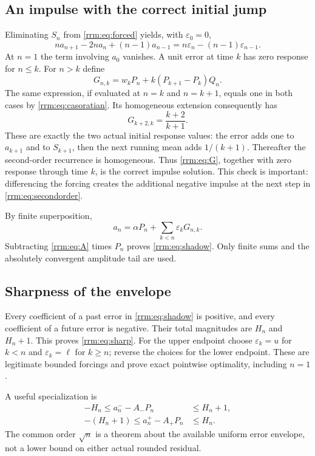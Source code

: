 \documentclass[11pt]{article}
\theoremstyle{remark}\newtheorem{remark}[theorem]{Remark}
\newcommand{\eps}{\varepsilon}
\begin{document}
\subsection{An impulse with the correct initial jump}
Eliminating $S_n$ from \eqref{rrm:eq:forced} yields, with $\eps_0=0$,
\begin{equation}\label{rrm:eq:secondorder}
 na_{n+1}-2na_n+(n-1)a_{n-1}
 =n\eps_n-(n-1)\eps_{n-1}.
\end{equation}
At $n=1$ the term involving $a_0$ vanishes. A unit error at time $k$ has zero response for $n\le k$. For $n>k$ define
\begin{equation}\label{rrm:eq:G}
 G_{n,k}=w_kP_n+k(P_{k+1}-P_k)Q_n.
\end{equation}
The same expression, if evaluated at $n=k$ and $n=k+1$, equals one in both cases by \eqref{rrm:eq:casoratian}. Its homogeneous extension consequently has
\[
 G_{k+2,k}=\frac{k+2}{k+1}.
\]
These are exactly the two actual initial response values: the error adds one to $a_{k+1}$ and to $S_{k+1}$, then the next running mean adds $1/(k+1)$. Thereafter the second-order recurrence is homogeneous. Thus \eqref{rrm:eq:G}, together with zero response through time $k$, is the correct impulse solution. This check is important: differencing the forcing creates the additional negative impulse at the next step in \eqref{rrm:eq:secondorder}.

By finite superposition,
\begin{equation}\label{rrm:eq:variation}
 a_n=\alpha P_n+\sum_{k<n}\eps_kG_{n,k}.
\end{equation}
Subtracting \eqref{rrm:eq:A} times $P_n$ proves \eqref{rrm:eq:shadow}. Only finite sums and the absolutely convergent amplitude tail are used.

\subsection{Sharpness of the envelope}
Every coefficient of a past error in \eqref{rrm:eq:shadow} is positive, and every coefficient of a future error is negative. Their total magnitudes are $H_n$ and $H_n+1$. This proves \eqref{rrm:eq:sharp}. For the upper endpoint choose $\eps_k=u$ for $k<n$ and $\eps_k=\ell$ for $k\ge n$; reverse the choices for the lower endpoint. These are legitimate bounded forcings and prove exact pointwise optimality, including $n=1$.

A useful specialization is
\begin{align}
 -H_n\le a_n^--A_-P_n&\le H_n+1,\label{rrm:eq:floorenv}\\
 -(H_n+1)\le a_n^+-A_+P_n&\le H_n.\label{rrm:eq:ceilenv}
\end{align}
The common order $\sqrt n$ is a theorem about the available uniform error envelope, not a lower bound on either actual rounded residual.
\end{document}
